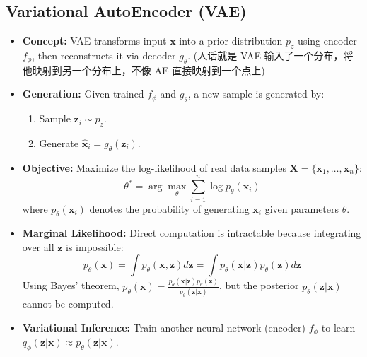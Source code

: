 \documentclass[UTF8]{ctexart}
\begin{document}
\subsection{Variational AutoEncoder (VAE)}
\begin{itemize}
    \item \textbf{Concept:} VAE transforms input $\mathbf{x}$ into a prior distribution $p_z$ 
    using encoder $f_\phi$, then reconstructs it via decoder $g_\theta$.
    (人话就是 VAE 输入了一个分布，将他映射到另一个分布上，不像 AE 直接映射到一个点上)
    \item \textbf{Generation:} Given trained $f_\phi$ and $g_\theta$, a new sample is generated by:
    \begin{enumerate}
        \item Sample $\mathbf{z}_i \sim p_z$.
        \item Generate $\hat{\mathbf{x}}_i = g_\theta(\mathbf{z}_i)$.
    \end{enumerate}
    \item \textbf{Objective:} Maximize the log-likelihood of real data samples $\mathbf{X} = \{\mathbf{x}_1, \dots, \mathbf{x}_n\}$:
    $$\theta^* = \arg \max_\theta \sum_{i=1}^n \log p_\theta(\mathbf{x}_i)$$
    where $p_\theta(\mathbf{x}_i)$ denotes the probability of generating $\mathbf{x}_i$ given parameters $\theta$.

    \item \textbf{Marginal Likelihood:} Direct computation is intractable because integrating over all $\mathbf{z}$ is impossible:
    $$p_\theta(\mathbf{x}) = \int p_\theta(\mathbf{x}, \mathbf{z})d\mathbf{z} = \int p_\theta(\mathbf{x}|\mathbf{z})p_\theta(\mathbf{z})d\mathbf{z}$$
    Using Bayes' theorem, $p_\theta(\mathbf{x}) = \frac{p_\theta(\mathbf{x}|\mathbf{z})p_\theta(\mathbf{z})}{p_\theta(\mathbf{z}|\mathbf{x})}$, but the posterior $p_\theta(\mathbf{z}|\mathbf{x})$ cannot be computed.
    
    \item \textbf{Variational Inference:} Train another neural network (encoder) $f_\phi$ to learn $q_\phi(\mathbf{z}|\mathbf{x}) \approx p_\theta(\mathbf{z}|\mathbf{x})$.
    

\end{itemize}
\end{document}
